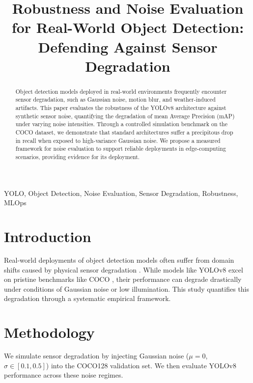 \documentclass[conference]{IEEEtran}
\begin{document}
\title{Robustness and Noise Evaluation for Real-World Object Detection: Defending Against Sensor Degradation}

\author{
}

\maketitle

\begin{abstract}
Object detection models deployed in real-world environments frequently encounter sensor degradation, such as Gaussian noise, motion blur, and weather-induced artifacts. This paper evaluates the robustness of the YOLOv8 architecture against synthetic sensor noise, quantifying the degradation of mean Average Precision (mAP) under varying noise intensities. Through a controlled simulation benchmark on the COCO dataset, we demonstrate that standard architectures suffer a precipitous drop in recall when exposed to high-variance Gaussian noise. We propose a measured framework for noise evaluation to support reliable deployments in edge-computing scenarios, providing evidence for its deployment.
\end{abstract}

\begin{IEEEkeywords}
YOLO, Object Detection, Noise Evaluation, Sensor Degradation, Robustness, MLOps
\end{IEEEkeywords}

\section{Introduction}
Real-world deployments of object detection models often suffer from domain shifts caused by physical sensor degradation \cite{hendrycks2019robustness}. While models like YOLOv8 \cite{jocher2023ultralytics} excel on pristine benchmarks like COCO \cite{lin2014microsoft}, their performance can degrade drastically under conditions of Gaussian noise or low illumination. This study quantifies this degradation through a systematic empirical framework.

\section{Methodology}
We simulate sensor degradation by injecting Gaussian noise ($\mu=0$, $\sigma \in [0.1, 0.5]$) into the COCO128 validation set. We then evaluate YOLOv8 performance across these noise regimes. 
\end{document}
